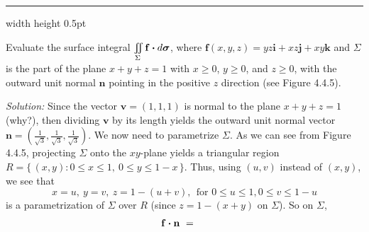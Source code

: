 \medskip
\hrule width \textwidth height 0.5pt
\begin{exmp}\label{exmp:surfintex}
 Evaluate the surface integral $\iint\limits_{\Sigma} \mathbf{f} \bm{\cdot} d\bm{\sigma}$, where
 $\mathbf{f}(x,y,z) = yz\mathbf{i} + xz\mathbf{j} + xy\mathbf{k}$ and $\Sigma$ is the part of the plane $x+y+z=1$
 with $x \ge 0$, $y \ge 0$, and $z \ge 0$, with the outward unit normal $\mathbf{n}$ pointing in the positive $z$
 direction (see Figure 4.4.5).\smallskip
 \piccaption[]{}
 \par\noindent \emph{Solution:} Since the vector $\mathbf{v} = (1,1,1)$ is normal to the plane $x+y+z=1$ (why?), then
 dividing $\mathbf{v}$ by its length yields the outward unit normal vector $\mathbf{n} = \left( \frac{1}{\sqrt{3}},
 \frac{1}{\sqrt{3}},\frac{1}{\sqrt{3}} \right)$. We now need to parametrize $\Sigma$. As we can see from Figure 4.4.5,
 projecting $\Sigma$ onto the $xy$-plane yields a triangular region
 $R= \lbrace\,(x,y): 0 \le x \le 1,~ 0 \le y \le 1-x\,\rbrace$. Thus, using $(u,v)$ instead of $(x,y)$, we see that
 \begin{displaymath}
  x=u,~ y=v,~ z=1-(u+v),~~\text{for~} 0 \le u \le 1, 0 \le v \le 1-u
 \end{displaymath}
 is a parametrization of $\Sigma$ over $R$ (since $z=1-(x+y)$ on $\Sigma$). So on $\Sigma$,
 \begin{align*}
  \Dotprod{\mathbf{f}}{\mathbf{n}} ~&=~

\end{align*}
\end{exmp}
